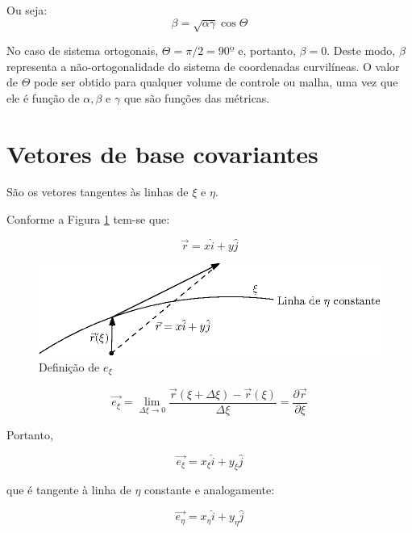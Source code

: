 Ou seja:
\begin{equation}
    \label{eq:3.21}
    \beta = \sqrt{\alpha \gamma}\cos{\Theta}
\end{equation}

No caso de sistema ortogonais, $\Theta = \pi/2 = 90º$ e, portanto, $\beta = 0$. Deste modo, $\beta$ representa a não-ortogonalidade do sistema de coordenadas curvilíneas. O valor de $\Theta$ pode ser obtido para qualquer volume de controle ou malha, uma vez que ele é função de $\alpha, \beta$ e $\gamma$ que são funções das métricas.

\section{Vetores de base covariantes}
São os vetores tangentes às linhas de $\xi$ e $\eta$.

Conforme a Figura \ref{fig:e_xi} tem-se que:

\begin{equation}
    \label{eq:3.22}
    \vec{r} = x \hat{i} + y \hat{j}
\end{equation}

\begin{figure}[h]
    \centering
    \includegraphics{fig/e_xi.eps}
    \caption{Definição de $e_\xi$}
    \label{fig:e_xi}
\end{figure}

\begin{equation}
    \label{eq:3.23}
    \vec{e_\xi} = \lim_{\Delta \xi \to 0} \frac{\vec{r}(\xi + \Delta \xi) - \vec{r}(\xi)}{\Delta \xi} = \frac{\partial \vec{r}}{\partial \xi}
\end{equation}

Portanto,

\begin{equation}
    \label{eq:3.24}
    \vec{e_\xi} = x_\xi \hat{i} + y_\xi \hat{j}
\end{equation}

que é tangente à linha de $\eta$ constante e analogamente:

\begin{equation}
    \label{eq:3.25}
    \vec{e_\eta} = x_\eta \hat{i} + y_\eta \hat{j}
\end{equation}

